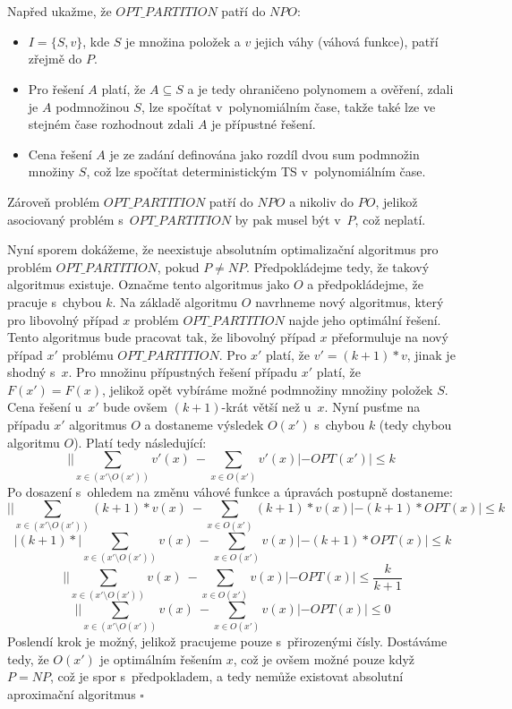 \documentclass[a4paper]{article}
\newcommand{\prt}{OPT\_PARTITION}
\begin{document}
\section*{}
Napřed ukažme, že $\prt$ patří do $NPO$:
\begin{itemize}
 \item $I=\{S,v\}$, kde $S$ je množina položek a $v$ jejich váhy (váhová funkce), patří zřejmě do $P$.
 \item Pro řešení $A$ platí, že $A\subseteq S$ a je tedy ohraničeno polynomem a ověření, zdali je $A$ podmnožinou $S$, lze spočítat v~polynomiálním čase,
       takže také lze ve stejném čase rozhodnout zdali $A$ je přípustné řešení.
 \item Cena řešení $A$ je ze zadání definována jako rozdíl dvou sum podmnožin množiny $S$,
 což lze spočítat deterministickým TS v~polynomiálním čase.
\end{itemize}
 Zároveň problém $\prt$ patří do $NPO$ a nikoliv do $PO$, jelikož asociovaný problém s~$\prt$ by pak musel být v~$P$, což neplatí.

 Nyní sporem dokážeme, že neexistuje absolutním optimalizační algoritmus pro problém $\prt$, pokud $P \neq NP$.
 Předpokládejme tedy, že takový algoritmus existuje.
 Označme tento algoritmus jako $O$ a předpokládejme, že pracuje s~chybou $k$.
 Na základě algoritmu $O$ navrhneme nový algoritmus, který pro libovolný případ $x$ problém $\prt$ najde jeho optimální řešení.
 Tento algoritmus bude pracovat tak, že libovolný případ $x$ přeformuluje na nový případ $x'$ problému $\prt$.
 Pro $x'$ platí, že $v'=(k+1)*v$, jinak je shodný s~$x$.
 Pro množinu přípustných řešení případu $x'$ platí, že $F(x')=F(x)$, jelikož opět vybíráme možné podmnožiny množiny položek $S$.
 Cena řešení u~$x'$ bude ovšem $(k+1)$-krát větší než u~$x$.
 Nyní pusťme na případu $x'$ algoritmus $O$ a dostaneme výsledek $O(x')$ s~chybou $k$ (tedy chybou algoritmu $O$).
 Platí tedy následující:
 $$ ||\sum_{x\in (x'\setminus O(x'))} v'(x)\ - \sum_{x\in O(x')} v'(x)| - OPT(x')| \leq k~$$
 Po dosazení s~ohledem na změnu váhové funkce a úpravách postupně dostaneme:
 $$ ||\sum_{x\in (x'\setminus O(x'))} (k+1)*v(x)\ - \sum_{x\in O(x')} (k+1)*v(x)| - (k+1)*OPT(x)| \leq k$$
 $$ |(k+1)*|\sum_{x\in (x'\setminus O(x'))} v(x)\ - \sum_{x\in O(x')} v(x)| - (k+1)*OPT(x)| \leq k$$
 $$ ||\sum_{x\in (x'\setminus O(x'))} v(x)\ - \sum_{x\in O(x')} v(x)| - OPT(x)| \leq \frac{k}{k+1}$$
 $$ ||\sum_{x\in (x'\setminus O(x'))} v(x)\ - \sum_{x\in O(x')} v(x)| - OPT(x)| \leq 0$$
 Poslendí krok je možný, jelikož pracujeme pouze s~přirozenými čísly.
 Dostáváme tedy, že $O(x')$ je optimálním řešením $x$, což je ovšem možné pouze když $P=NP$, což je spor s~předpokladem,
 a tedy nemůže existovat absolutní aproximační algoritmus $\square$
\end{document}
